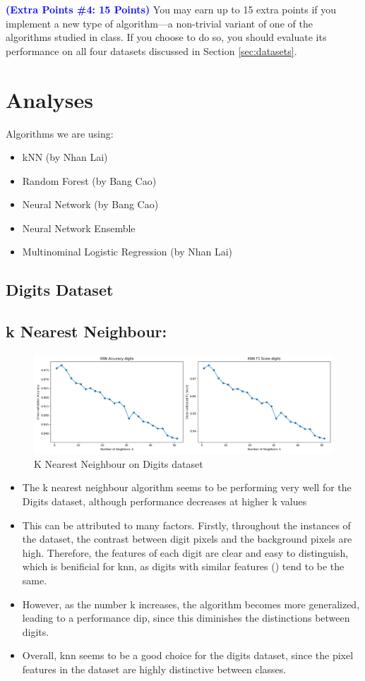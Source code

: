 \documentclass[letterpaper]{article}
\newcommand{\HIGHLIGHT}[1]{\textcolor{blue}{\textbf{#1}}}
\begin{document}
\noindent \HIGHLIGHT{(Extra Points \#4: 15 Points)}
You may earn up to 15 extra points if you implement a new type of algorithm---a non-trivial variant of one of the algorithms studied in class. If you choose to do so, you should evaluate its performance on all four datasets discussed in Section \ref{sec:datasets}.

\section{Analyses}

Algorithms we are using:
\begin{itemize}
	\item kNN (by Nhan Lai)
	\item Random Forest (by Bang Cao)
	\item Neural Network (by Bang Cao)
	\item Neural Network Ensemble
	\item Multinominal Logistic Regression (by Nhan Lai)
\end{itemize}

\subsection{Digits Dataset}
\subsection*{k Nearest Neighbour:}

\begin{figure}[H]
	\includegraphics[width=\textwidth]{figures/knn_digits.png}
	\caption{K Nearest Neighbour on Digits dataset}
	\label{fig:knn-digits}
\end{figure}
\begin{itemize}
	\item The k nearest neighbour algorithm seems to be performing very well for the Digits dataset, although performance decreases at higher k values
	\item This can be attributed to many factors. Firstly, throughout the instances of the dataset, the contrast between digit pixels and the background 
	pixels are high. Therefore, the features of each digit are clear and easy to distinguish, which is benificial for knn, as digits with similar features () tend to be the same. 
	\item However, as the number k increases, the algorithm becomes more generalized, leading to a performance dip, since this diminishes the distinctions between digits.
	\item Overall, knn seems to be a good choice for the digits dataset, since the pixel features in the dataset are highly distinctive between classes. 
\end{itemize}
\end{document}
